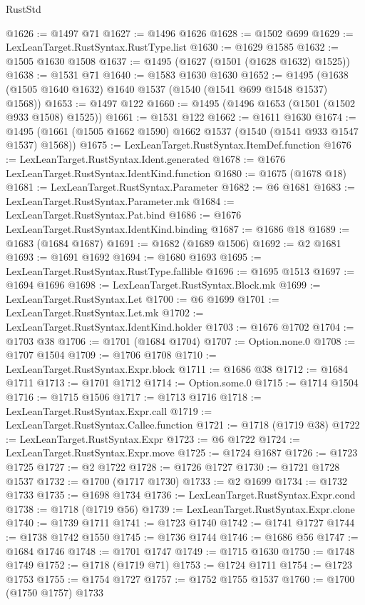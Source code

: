 \begin{lexlean}{RustStd}
\begin{coremodule}
@1626 := @1497 @71
@1627 := @1496 @1626
@1628 := @1502 @699
@1629 := LexLeanTarget.RustSyntax.RustType.list
@1630 := @1629 @1585
@1632 := @1505 @1630 @1508
@1637 := @1495 (@1627 (@1501 (@1628 @1632) @1525))
@1638 := @1531 @71
@1640 := @1583 @1630 @1630
@1652 := @1495 (@1638 (@1505 @1640 @1632) @1640 @1537 (@1540 (@1541 @699 @1548 @1537) @1568))
@1653 := @1497 @122
@1660 := @1495 (@1496 @1653 (@1501 (@1502 @933 @1508) @1525))
@1661 := @1531 @122
@1662 := @1611 @1630
@1674 := @1495 (@1661 (@1505 @1662 @1590) @1662 @1537 (@1540 (@1541 @933 @1547 @1537) @1568))
@1675 := LexLeanTarget.RustSyntax.ItemDef.function
@1676 := LexLeanTarget.RustSyntax.Ident.generated
@1678 := @1676 LexLeanTarget.RustSyntax.IdentKind.function
@1680 := @1675 (@1678 @18)
@1681 := LexLeanTarget.RustSyntax.Parameter
@1682 := @6 @1681
@1683 := LexLeanTarget.RustSyntax.Parameter.mk
@1684 := LexLeanTarget.RustSyntax.Pat.bind
@1686 := @1676 LexLeanTarget.RustSyntax.IdentKind.binding
@1687 := @1686 @18
@1689 := @1683 (@1684 @1687)
@1691 := @1682 (@1689 @1506)
@1692 := @2 @1681
@1693 := @1691 @1692
@1694 := @1680 @1693
@1695 := LexLeanTarget.RustSyntax.RustType.fallible
@1696 := @1695 @1513
@1697 := @1694 @1696
@1698 := LexLeanTarget.RustSyntax.Block.mk
@1699 := LexLeanTarget.RustSyntax.Let
@1700 := @6 @1699
@1701 := LexLeanTarget.RustSyntax.Let.mk
@1702 := LexLeanTarget.RustSyntax.IdentKind.holder
@1703 := @1676 @1702
@1704 := @1703 @38
@1706 := @1701 (@1684 @1704)
@1707 := Option.none.{0}
@1708 := @1707 @1504
@1709 := @1706 @1708
@1710 := LexLeanTarget.RustSyntax.Expr.block
@1711 := @1686 @38
@1712 := @1684 @1711
@1713 := @1701 @1712
@1714 := Option.some.{0}
@1715 := @1714 @1504
@1716 := @1715 @1506
@1717 := @1713 @1716
@1718 := LexLeanTarget.RustSyntax.Expr.call
@1719 := LexLeanTarget.RustSyntax.Callee.function
@1721 := @1718 (@1719 @38)
@1722 := LexLeanTarget.RustSyntax.Expr
@1723 := @6 @1722
@1724 := LexLeanTarget.RustSyntax.Expr.move
@1725 := @1724 @1687
@1726 := @1723 @1725
@1727 := @2 @1722
@1728 := @1726 @1727
@1730 := @1721 @1728 @1537
@1732 := @1700 (@1717 @1730)
@1733 := @2 @1699
@1734 := @1732 @1733
@1735 := @1698 @1734
@1736 := LexLeanTarget.RustSyntax.Expr.cond
@1738 := @1718 (@1719 @56)
@1739 := LexLeanTarget.RustSyntax.Expr.clone
@1740 := @1739 @1711
@1741 := @1723 @1740
@1742 := @1741 @1727
@1744 := @1738 @1742 @1550
@1745 := @1736 @1744
@1746 := @1686 @56
@1747 := @1684 @1746
@1748 := @1701 @1747
@1749 := @1715 @1630
@1750 := @1748 @1749
@1752 := @1718 (@1719 @71)
@1753 := @1724 @1711
@1754 := @1723 @1753
@1755 := @1754 @1727
@1757 := @1752 @1755 @1537
@1760 := @1700 (@1750 @1757) @1733

\end{coremodule}
\end{lexlean}
